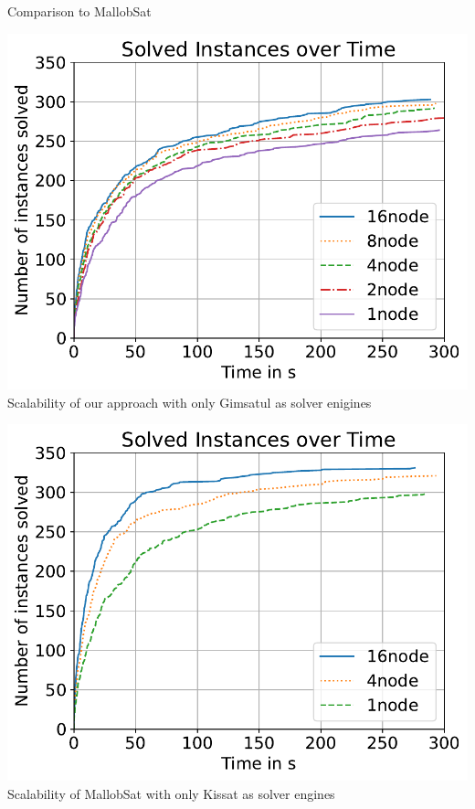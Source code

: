 \documentclass[]{sdqbeamer}
\begin{document}
\begin{frame}{Comparison to MallobSat}
    \begin{minipage}{0.45\textwidth}
        \center
        \includegraphics[scale=.8]{plots/cumulative_runtime/scalability_gim.pdf}\\
        Scalability of our approach with only Gimsatul as solver enigines
    \end{minipage}
    \hfill
    \begin{minipage}{0.45\textwidth}
        \center
        \includegraphics[scale=.8]{plots/cumulative_runtime/scalability_kis.pdf}\\
        Scalability of MallobSat with only Kissat as solver engines%
    \end{minipage}
\end{frame}
\end{document}
